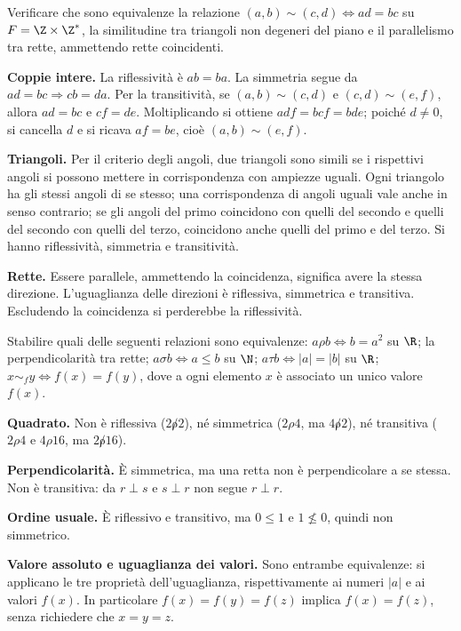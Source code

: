 \begin{esercizio}
Verificare che sono equivalenze la relazione $(a,b)\sim(c,d)\iff ad=bc$ su $F=\Z\times\Z^*$, la similitudine tra triangoli non degeneri del piano e il parallelismo tra rette, ammettendo rette coincidenti.
\end{esercizio}
\begin{svolgimento}
\textbf{Coppie intere.} La riflessività è $ab=ba$. La simmetria segue da $ad=bc\Rightarrow cb=da$. Per la transitività, se $(a,b)\sim(c,d)$ e $(c,d)\sim(e,f)$, allora $ad=bc$ e $cf=de$. Moltiplicando si ottiene $adf=bcf=bde$; poiché $d\ne0$, si cancella $d$ e si ricava $af=be$, cioè $(a,b)\sim(e,f)$.

\textbf{Triangoli.} Per il criterio degli angoli, due triangoli sono simili se i rispettivi angoli si possono mettere in corrispondenza con ampiezze uguali. Ogni triangolo ha gli stessi angoli di se stesso; una corrispondenza di angoli uguali vale anche in senso contrario; se gli angoli del primo coincidono con quelli del secondo e quelli del secondo con quelli del terzo, coincidono anche quelli del primo e del terzo. Si hanno riflessività, simmetria e transitività.

\textbf{Rette.} Essere parallele, ammettendo la coincidenza, significa avere la stessa direzione. L'uguaglianza delle direzioni è riflessiva, simmetrica e transitiva. Escludendo la coincidenza si perderebbe la riflessività.
\end{svolgimento}

\begin{esercizio}
Stabilire quali delle seguenti relazioni sono equivalenze: $a\rho b\iff b=a^2$ su $\R$; la perpendicolarità tra rette; $a\sigma b\iff a\le b$ su $\N$; $a\tau b\iff |a|=|b|$ su $\R$; $x\sim_f y\iff f(x)=f(y)$, dove a ogni elemento $x$ è associato un unico valore $f(x)$.
\end{esercizio}
\begin{svolgimento}
\textbf{Quadrato.} Non è riflessiva ($2\not\rho2$), né simmetrica ($2\rho4$, ma $4\not\rho2$), né transitiva ($2\rho4$ e $4\rho16$, ma $2\not\rho16$).

\textbf{Perpendicolarità.} È simmetrica, ma una retta non è perpendicolare a se stessa. Non è transitiva: da $r\perp s$ e $s\perp r$ non segue $r\perp r$.

\textbf{Ordine usuale.} È riflessivo e transitivo, ma $0\le1$ e $1\nleq0$, quindi non simmetrico.

\textbf{Valore assoluto e uguaglianza dei valori.} Sono entrambe equivalenze: si applicano le tre proprietà dell'uguaglianza, rispettivamente ai numeri $|a|$ e ai valori $f(x)$. In particolare $f(x)=f(y)=f(z)$ implica $f(x)=f(z)$, senza richiedere che $x=y=z$.
\end{svolgimento}

